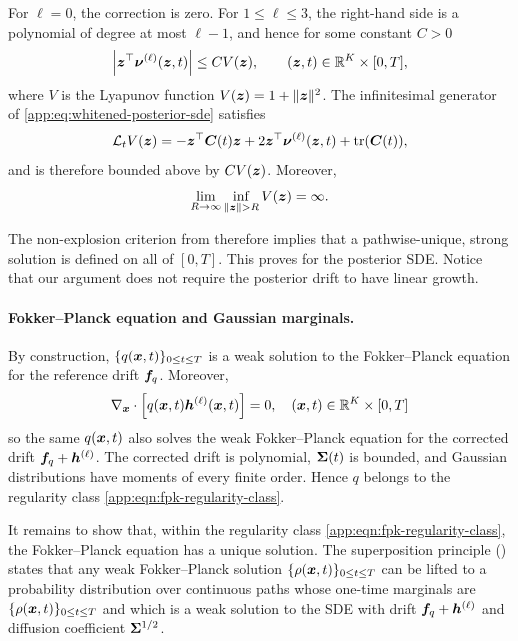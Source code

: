 For $\ell=0$, the correction is zero.  For $1\leq\ell\leq3$, the right-hand side is a polynomial of degree at most $\ell-1$, and hence for some constant $C > 0$
\begin{equation*}
    \left|\boldsymbol{z}^\top\boldsymbol{\nu}^{(\ell)}(\boldsymbol{z},t)\right| \leq CV(\boldsymbol{z}), \qquad (\boldsymbol{z},t) \in \mathbb{R}^K \times [0,T],
\end{equation*}
where $V$ is the Lyapunov function $V(\boldsymbol{z})=1+\|\boldsymbol{z}\|^2$. 
The infinitesimal generator of \cref{app:eq:whitened-posterior-sde} satisfies
\begin{equation*}
    \mathcal{L}_t V(\boldsymbol{z})=-\boldsymbol{z}^\top\boldsymbol{C}(t)\boldsymbol{z} +2\boldsymbol{z}^\top\boldsymbol{\nu}^{(\ell)}(\boldsymbol{z},t) +\mathrm{tr}(\boldsymbol{C}(t)),
\end{equation*}
and is therefore bounded above by $C V(\boldsymbol{z})$.  Moreover,
\begin{equation*}
    \lim_{R\to\infty} \inf_{\|\mbz\|>R}V(\mbz)=\infty.
\end{equation*}

The non-explosion criterion from \citet[Theorem~3.5]{khasminskii2011stochastic} therefore implies that a pathwise-unique, strong solution is defined on all of $[0, T]$. 
This proves  for the posterior SDE.
Notice that our argument does not require the posterior drift to have linear
growth.

\paragraph{Fokker--Planck equation and Gaussian marginals.}
By construction, $\{q(\boldsymbol{x},t)\}_{0 \leq t \leq T}$ is a weak solution to the Fokker--Planck equation for the reference drift $\boldsymbol{f}_q$.  
Moreover,
\begin{equation*}
    \nabla_{\boldsymbol{x}}\cdot  \left[q(\boldsymbol{x},t)\boldsymbol{h}^{(\ell)}(\boldsymbol{x},t)\right] =0, \quad (\boldsymbol{x}, t) \in \mathbb{R}^K \times [0, T]
\end{equation*}
so the same $q(\boldsymbol{x},t)$ also solves the weak Fokker--Planck equation for the corrected drift $\boldsymbol{f}_q+\boldsymbol{h}^{(\ell)}$.  
The corrected drift is polynomial, $\boldsymbol{\Sigma}(t)$ is bounded, and Gaussian distributions have moments of every finite order.  
Hence $q$ belongs to the regularity class \cref{app:eqn:fpk-regularity-class}.

It remains to show that, within the regularity class \cref{app:eqn:fpk-regularity-class}, the Fokker--Planck equation has a unique solution. 
The superposition principle (\citet[Theorem~2.5]{trevisan2016well}) states that any weak Fokker--Planck solution $\{\rho(\boldsymbol{x}, t)\}_{0 \leq t \leq T}$ can be lifted to a probability distribution over continuous paths whose one-time marginals are $\{\rho(\boldsymbol{x}, t)\}_{0 \leq t \leq T}$ and which is a weak solution to the SDE with drift $\boldsymbol{f}_q+\boldsymbol{h}^{(\ell)}$ and diffusion coefficient $\boldsymbol{\Sigma}^{1/2}$.

